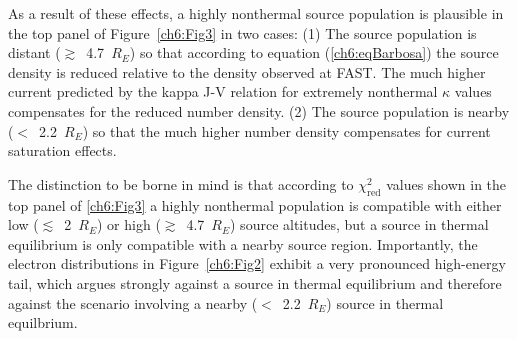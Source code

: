 
  As a result of these effects, a highly nonthermal source population is
  plausible in the top panel of Figure~\ref{ch6:Fig3} in two cases: (1) The
  source population is distant ($\gtrsim$~4.7~$R_E$) so that according to
  equation (\ref{ch6:eqBarbosa}) the source density is reduced relative to the
  density observed at FAST. The much higher current predicted by the kappa J-V
  relation for extremely nonthermal $\kappa$ values compensates for the reduced
  number density. (2) The source population is nearby ($<$~2.2~$R_E$) so that
  the much higher number density compensates for current saturation effects.

  The distinction to be borne in mind is that according to
  $\chi^2_{\mathrm{red}}$ values shown in the top panel of \ref{ch6:Fig3} a
  highly nonthermal population is compatible with either low
  ($\lesssim$~2~$R_E$) or high ($\gtrsim$~4.7~$R_E$) source altitudes, but a
  source in thermal equilibrium is only compatible with a nearby source
  region. Importantly, the electron distributions in Figure~\ref{ch6:Fig2}
  exhibit a very pronounced high-energy tail, which argues strongly against a
  source in thermal equilibrium and therefore against the scenario involving a
  nearby ($<$~2.2~$R_E$) source in thermal equilbrium.

